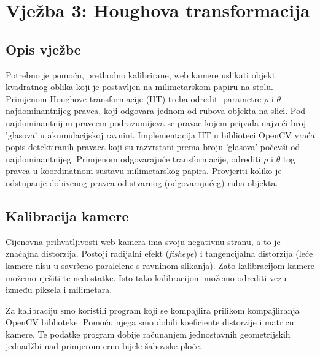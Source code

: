 \setcounter{figure}{0}
\setcounter{lstlisting}{0}
\section{Vježba 3: Houghova transformacija}

\subsection{Opis vježbe}
Potrebno je pomoću, prethodno kalibrirane, web kamere uslikati objekt
kvadratnog oblika koji je postavljen na milimetarskom papiru na stolu.
Primjenom Houghove transformacije (HT) treba odrediti parametre 
\(\rho\) i \(\theta\) najdominantnijeg pravca, koji odgovara jednom od
rubova objekta na slici. Pod najdominantnijim pravcem podrazumijeva se
pravac kojem pripada najveći broj 'glasova' u akumulacijskoj ravnini.
Implementacija HT u biblioteci OpenCV vraća popis detektiranih pravaca
koji su razvrstani prema broju 'glasova' počevši od najdominantnijeg.
Primjenom odgovarajuće transformacije, odrediti \(\rho\) i \(\theta\)
tog pravca u koordinatnom sustavu milimetarskog papira. Provjeriti
koliko je odstupanje dobivenog pravca od stvarnog (odgovarajućeg) ruba
objekta.

\subsection{Kalibracija kamere}
Cijenovna prihvatljivosti web kamera ima svoju negativnu stranu, a to je
značajna distorzija. Postoji radijalni efekt (\textit{fisheye}) i
tangencijalna distorzija (leće kamere nisu u savršeno paralelene s
ravninom slikanja). Zato kalibracijom kamere možemo rješiti te
nedostatke. Isto tako kalibracijom možemo odrediti vezu između piksela i
milimetara.

Za kalibraciju smo koristili program koji se kompajlira prilikom
kompajliranja OpenCV biblioteke. Pomoću njega smo dobili koeficiente
distorzije i matricu kamere. Te podatke program dobije računanjem
jednostavnih geometrijskih jednadžbi nad primjerom crno bijele šahovske ploče.

